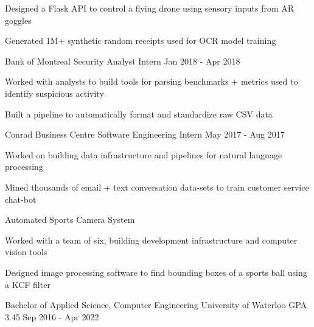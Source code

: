 \documentclass[11pt, a4paper]{awesome-cv}
\begin{document}
\begin{siderules1}
\begin{cventries}
{\begin{cvitems}
        \item {Designed a Flask API to control a flying drone using sensory inputs from AR goggles}
        \item {Generated 1M+ synthetic random receipts used for OCR model training}
      \end{cvitems}
    }
  \cventry
    {\textit{}}
    {Bank of Montreal}
    {Security Analyst Intern}
    {Jan 2018 - Apr 2018}
    {
      \begin{cvitems}
        \item {Worked with analysts to build tools for parsing benchmarks + metrics used to identify suspicious activity}
        \item {Built a pipeline to automatically format and standardize raw CSV data}
      \end{cvitems}
    }
  \cventry
    {\textit{}}
    {Conrad Business Centre}
    {Software Engineering Intern}
    {May 2017 - Aug 2017}
    {
      \begin{cvitems}
        \item {Worked on building data infrastructure and pipelines for natural language processing}
        \item {Mined thousands of email + text conversation data-sets to train customer service chat-bot}
      \end{cvitems}
    }
\end{cventries}
\end{siderules1}

\begin{siderules2}
\begin{cventries}
    \cventry
        {\textit{}}
        {Automated Sports Camera System}
        {}
        {}
        {
          \begin{cvitems}
            \item {Worked with a team of six, building development infrastructure and computer vision tools}
            \item {Designed image processing software to find bounding boxes of a sports ball using a KCF filter}
          \end{cvitems}
        }
\end{cventries}
\end{siderules2}
\begin{siderules3}
\begin{cventries}
    \education
    {\fontsize{11pt}{1.3em}\bodyfont\upshape\color{text}\selectfont Bachelor of Applied Science, Computer Engineering}
    {University of Waterloo}
    {GPA 3.45}
    {Sep 2016 - Apr 2022}
    {
      \begin{cvitems}
      \end{cvitems}
    }
\end{cventries}
\end{siderules3}
\end{document}
